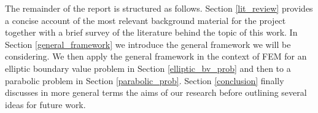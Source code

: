 The remainder of the report is structured as follows. Section \textcolor{blue}{\ref{lit_review}} provides a concise account of the most relevant background material for the project together with a brief survey of the literature behind the topic of this work. In Section \textcolor{blue}{\ref{general_framework}} we introduce the general framework we will be considering. We then apply the general framework in the context of FEM for an elliptic boundary value problem in Section \textcolor{blue}{\ref{elliptic_bv_prob}} and then to a parabolic problem in Section \textcolor{blue}{\ref{parabolic_prob}}. Section \textcolor{blue}{\ref{conclusion}} finally discusses in more general terms the aims of our research before outlining several ideas for future work.
